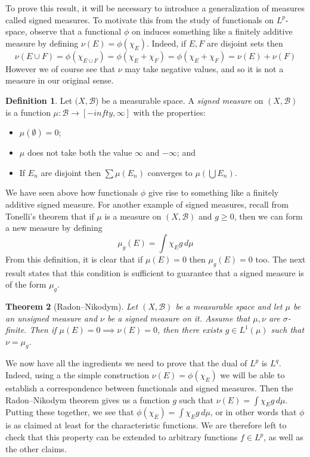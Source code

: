 \documentclass[11pt,oneside]{amsbook}
\theoremstyle{definition}
\theoremstyle{plain}
\newtheorem{thm}{Theorem}[section]
\theoremstyle{definition}
\newtheorem{defn}[thm]{Definition}
\theoremstyle{remark}
\numberwithin{equation}{section}
\numberwithin{figure}{section}
\begin{document}
To prove this result, it will be necessary to introduce a generalization of measures called signed measures. To motivate this from the study of functionals on $L^p$-space, observe that a functional $\phi$ on induces something like a finitely additive measure by defining $\nu(E)=\phi(\chi_E)$. Indeed, if $E,F$ are disjoint sets then
\[\nu(E\cup F)=\phi(\chi_{E\cup F})=\phi(\chi_E+\chi_F)
  =\phi(\chi_E+\chi_F)=\nu(E)+\nu(F)
\]
However we of course see that $\nu$ may take negative values, and so it is not a measure in our original sense.

\begin{defn}
  Let $(X,\mathcal B$) be a measurable space. A \emph{signed measure} on $(X,\mathcal B)$ is a function $\mu\colon\mathcal B\to[-infty,\infty]$ with the properties:
  \begin{itemize}
  \item $\mu(\emptyset)=0$;
  \item $\mu$ does not take both the value $\infty$ and $-\infty$; and
  \item If $E_n$ are disjoint then $\sum\mu(E_n)$ converges to $\mu(\bigcup E_n)$.
  \end{itemize}
\end{defn}

We have seen above how functionals $\phi$ give rise to something like a finitely additive signed measure. For another example of signed measures, recall from Tonelli's theorem that if $\mu$ is a measure on $(X,\mathcal B)$ and $g\geq0$, then we can form a new measure by defining
\[\mu_g(E)=\int\chi_Eg\,d\mu
\]
From this definition, it is clear that if $\mu(E)=0$ then $\mu_g(E)=0$ too. The next result states that this condition is sufficient to guarantee that a signed measure is of the form $\mu_g$.

\begin{thm}[Radon--Nikodym]
  Let $(X,\mathcal B)$ be a measurable space and let $\mu$ be an unsigned measure and $\nu$ be a signed measure on it. Assume that $\mu,\nu$ are $\sigma$-finite. Then if $\mu(E)=0\implies\nu(E)=0$, then there exists $g\in L^1(\mu)$ such that $\nu=\mu_g$.
\end{thm}

We now have all the ingredients we need to prove that the dual of $L^p$ is $L^q$. Indeed, using a the simple construction $\nu(E)=\phi(\chi_E)$ we will be able to establish a correspondence between functionals and signed measures. Then the Radon--Nikodym theorem gives us a function $g$ such that $\nu(E)=\int\chi_Eg\,d\mu$. Putting these together, we see that $\phi(\chi_E)=\int\chi_Eg\,d\mu$, or in other words that $\phi$ is as claimed at least for the characteristic functions. We are therefore left to check that this property can be extended to arbitrary functions $f\in L^p$, as well as the other claims.
\end{document}
